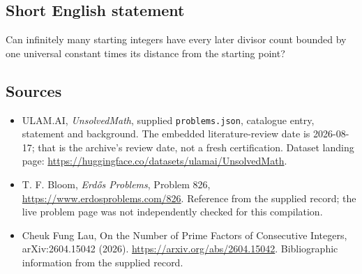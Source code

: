 \documentclass[11pt,a4paper]{article}
\begin{document}
\subsection{Short English statement}

Can infinitely many starting integers have every later divisor count bounded by one universal constant times its distance from the starting point?

\subsection{Sources}

{\small

\begin{itemize}

\item[\hypertarget{source:statement:1}{S1}] ULAM.AI, \emph{UnsolvedMath}, supplied \texttt{problems.json}, catalogue entry, statement and background. The embedded literature-review date is 2026-08-17; that is the archive’s review date, not a fresh certification. Dataset landing page: \url{https://huggingface.co/datasets/ulamai/UnsolvedMath}.

\item[\hypertarget{source:statement:2}{S2}] T. F. Bloom, \emph{Erdős Problems}, Problem 826, \url{https://www.erdosproblems.com/826}. Reference from the supplied record; the live problem page was not independently checked for this compilation.

\item[\hypertarget{source:statement:3}{S3}] Cheuk Fung Lau, On the Number of Prime Factors of Consecutive Integers, arXiv:2604.15042 (2026). \url{https://arxiv.org/abs/2604.15042}. Bibliographic information from the supplied record.

\end{itemize}

}

\label{end:statement}
\end{document}
